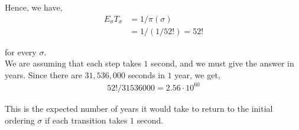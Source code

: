 \documentclass[12pt]{article}
\begin{document}
\begin{enumerate}[label=(\Alph*)]
Hence, we have,
\begin{align*}
E_{\sigma}T_{\sigma} &= 1/\pi(\sigma)\\
&= 1/(1/52!) = 52!
\end{align*}

for every $\sigma$.\\

We are assuming that each step takes $1$ second, and we must give the answer in years. Since there are $31,536,000$ seconds in $1$ year, we get,
\begin{align*}
52!/31536000 = 2.56 \cdot 10^{60}
\end{align*}

This is the expected number of years it would take to return to the initial ordering $\sigma$ if each transition takes $1$ second.
\end{enumerate}
\end{document}
